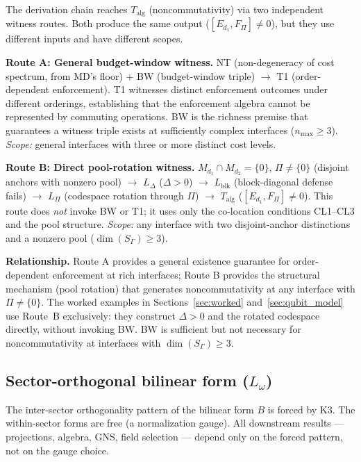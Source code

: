 \documentclass[11pt,a4paper]{article}
\theoremstyle{definition}
\begin{document}
\begin{tcolorbox}[apfbox, title={Two Distinct Routes to Noncommutativity}]
The derivation chain reaches $T_{\mathrm{alg}}$ (noncommutativity) via two independent witness routes.  Both produce the same output ($[E_{d_1}, F_\Pi] \ne 0$), but they use different inputs and have different scopes.

\smallskip\noindent\textbf{Route A: General budget-window witness.}  NT (non-degeneracy of cost spectrum, from MD's floor) + BW (budget-window triple) $\to$ T1 (order-dependent enforcement).  T1 witnesses distinct enforcement outcomes under different orderings, establishing that the enforcement algebra cannot be represented by commuting operations.  BW is the richness premise that guarantees a witness triple exists at sufficiently complex interfaces ($n_{\max} \ge 3$).  \textit{Scope:} general interfaces with three or more distinct cost levels.

\smallskip\noindent\textbf{Route B: Direct pool-rotation witness.}  $M_{d_1} \cap M_{d_2} = \{0\}$, $\Pi \ne \{0\}$ (disjoint anchors with nonzero pool) $\to$ $L_\Delta$ ($\Delta > 0$) $\to$ $L_{\mathrm{blk}}$ (block-diagonal defense fails) $\to$ $L_\Pi$ (codespace rotation through $\Pi$) $\to$ $T_{\mathrm{alg}}$ ($[E_{d_1}, F_\Pi] \ne 0$).  This route does \emph{not} invoke BW or T1; it uses only the co-location conditions CL1--CL3 and the pool structure.  \textit{Scope:} any interface with two disjoint-anchor distinctions and a nonzero pool ($\dim(S_\Gamma) \ge 3$).

\smallskip\noindent\textbf{Relationship.}  Route A provides a general existence guarantee for order-dependent enforcement at rich interfaces; Route B provides the structural mechanism (pool rotation) that generates noncommutativity at any interface with $\Pi \ne \{0\}$.  The worked examples in Sections~\ref{sec:worked} and~\ref{sec:qubit_model} use Route~B exclusively: they construct $\Delta > 0$ and the rotated codespace directly, without invoking BW.  BW is sufficient but not necessary for noncommutativity at interfaces with $\dim(S_\Gamma) \ge 3$.
\end{tcolorbox}

\subsection{Sector-orthogonal bilinear form ($L_\omega$)}

\noindent The inter-sector orthogonality pattern of the bilinear form $B$ is forced by K3.  The within-sector forms are free (a normalization gauge).  All downstream results --- projections, algebra, GNS, field selection --- depend only on the forced pattern, not on the gauge choice.
\end{document}
